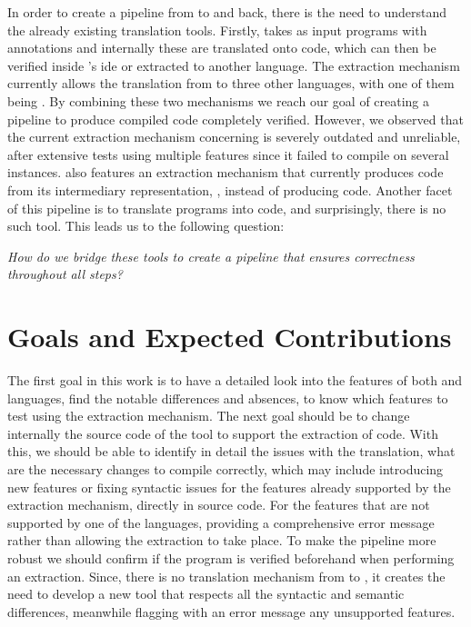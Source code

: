 In order to create a pipeline from \ocaml to \cml and back, there is the need to understand the already existing translation tools.
Firstly, \cameleer takes as input \ocaml programs with \gospel annotations and internally these are translated onto \whyml code, which
can then be verified inside \whythree's ide or extracted to another language. The \whythree extraction mechanism currently allows the 
translation from \whyml to three other languages, with one of them being \cml. By combining these two mechanisms we reach our goal
of creating a pipeline to produce compiled code completely verified. However, we observed that the current extraction mechanism 
concerning \cml is severely outdated and unreliable, after extensive tests using multiple \ocaml features since it failed to compile 
on several instances. \cameleer also features an extraction mechanism that currently produces \ocaml code from its intermediary
representation, \whyml, instead of producing \cml code. Another facet of this pipeline is to translate \cml programs into \ocaml
code, and surprisingly, there is no such tool. This leads us to the following question: 

\vspace{5mm}
\centerline{\textit{How do we bridge these tools to create a pipeline that ensures correctness throughout all steps?}}

\section{Goals and Expected Contributions}
\label{sec:Goals_and_Expected_Contributions}

The first goal in this work is to have a detailed look into the features of both \ocaml and \cml languages, find the notable 
differences and absences, to know which features to test using the extraction mechanism. The next goal should be to change 
internally the source code of the \cameleer tool to support the extraction of \cml code. With this, we should be able to identify
in detail the issues with the translation, what are the necessary changes to compile correctly, which may include introducing new features
or fixing syntactic issues for the features already supported by the extraction mechanism, directly in \whythree source code.
For the features that are not supported by one of the languages, providing a comprehensive error message rather than allowing 
the extraction to take place. To make the pipeline more robust we should confirm if the program is verified beforehand when performing 
an extraction. Since, there is no translation mechanism from \cml to \ocaml, it creates the need to develop a new tool that respects all 
the syntactic and semantic differences, meanwhile flagging with an error message any unsupported features.

